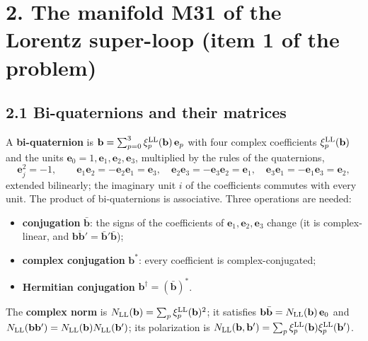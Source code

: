 \documentclass[
  10pt,
]{article}
\providecommand{\tightlist}{%
  \setlength{\itemsep}{0pt}\setlength{\parskip}{0pt}}
\begin{document}
\hypertarget{the-manifold-m31-of-the-lorentz-super-loop-item-1-of-the-problem}{%
\section{2. The manifold M31 of the Lorentz super-loop (item 1 of the
problem)}\label{the-manifold-m31-of-the-lorentz-super-loop-item-1-of-the-problem}}

\hypertarget{bi-quaternions-and-their-matrices}{%
\subsection{2.1 Bi-quaternions and their
matrices}\label{bi-quaternions-and-their-matrices}}

A \textbf{bi-quaternion} is
\(\mathbf b=\sum_{p=0}^3\xi^{\rm LL}_p(\mathbf b)\,\mathbf e_p\) with
four complex coefficients \(\xi^{\rm LL}_p(\mathbf b)\) and the units
\(\mathbf e_0=1,\mathbf e_1,\mathbf e_2,\mathbf e_3\), multiplied by the
rules of the quaternions,
\[\mathbf e_j^2=-1,\qquad\mathbf e_1\mathbf e_2=-\mathbf e_2\mathbf e_1=\mathbf e_3,\quad\mathbf e_2\mathbf e_3=-\mathbf e_3\mathbf e_2=\mathbf e_1,\quad\mathbf e_3\mathbf e_1=-\mathbf e_1\mathbf e_3=\mathbf e_2,\tag{2.1}\]
extended bilinearly; the imaginary unit \(i\) of the coefficients
commutes with every unit. The product of bi-quaternions is associative.
Three operations are needed:

\begin{itemize}
\tightlist
\item
  \textbf{conjugation} \(\bar{\mathbf b}\): the signs of the
  coefficients of \(\mathbf e_1,\mathbf e_2,\mathbf e_3\) change (it is
  complex-linear, and
  \(\overline{\mathbf b\mathbf b'}=\bar{\mathbf b}'\bar{\mathbf b}\));
\item
  \textbf{complex conjugation} \(\mathbf b^*\): every coefficient is
  complex-conjugated;
\item
  \textbf{Hermitian conjugation}
  \(\mathbf b^\dagger=(\bar{\mathbf b})^*\).
\end{itemize}

The \textbf{complex norm} is
\(N_{\rm LL}(\mathbf b)=\sum_p\xi^{\rm LL}_p(\mathbf b)^2\); it
satisfies
\(\mathbf b\bar{\mathbf b}=N_{\rm LL}(\mathbf b)\,\mathbf e_0\) and
\(N_{\rm LL}(\mathbf b\mathbf b')=N_{\rm LL}(\mathbf b)N_{\rm LL}(\mathbf b')\);
its polarization is
\(N_{\rm LL}(\mathbf b,\mathbf b')=\sum_p\xi^{\rm LL}_p(\mathbf b)\xi^{\rm LL}_p(\mathbf b')\).
\end{document}
